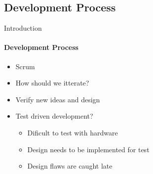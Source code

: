 \subsection{Development Process}
\begin{frame}{Introduction}\framesubtitle{Development Process}
    \begin{itemize}
        \item Scrum
        \item How should we itterate?
        \item Verify new ideas and design
        \item Test driven development?
        \begin{itemize}
            \item Dificult to test with hardware
            \item Design needs to be implemented for test
            \item Design flaws are caught late
        \end{itemize}
    \end{itemize}
\end{frame}

